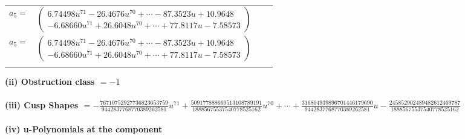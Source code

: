 \documentclass[1p]{elsarticle_modified}
\theoremstyle{definition}
\begin{document}
\begin{tabular}{m{7pt} m{180pt} m{7pt} m{180pt} }
\flushright $a_{5}=$&$\begin{pmatrix}6.74498 u^{71}-26.4676 u^{70}+\cdots-87.3523 u+10.9648\\-6.68660 u^{71}+26.6048 u^{70}+\cdots+77.8117 u-7.58573\end{pmatrix}$\\ \flushright $a_{5}=$&$\begin{pmatrix}6.74498 u^{71}-26.4676 u^{70}+\cdots-87.3523 u+10.9648\\-6.68660 u^{71}+26.6048 u^{70}+\cdots+77.8117 u-7.58573\end{pmatrix}$\\&\end{tabular}
\flushleft \textbf{(ii) Obstruction class $= -1$}\\~\\
\flushleft \textbf{(iii) Cusp Shapes $= -\frac{76710752927736823653759}{9442837768770389262581} u^{71}+\frac{509177888669513108789191}{18885675537540778525162} u^{70}+\cdots+\frac{316804939896701446179690}{9442837768770389262581} u-\frac{245852902489482612469787}{18885675537540778525162}$}\\~\\
\newpage\renewcommand{\arraystretch}{1}
\flushleft \textbf{(iv) u-Polynomials at the component}\newline \\
\end{document}
